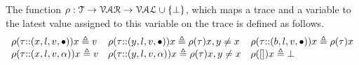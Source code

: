 The function $\rho : {\mathcal{T}} \to \mathcal{VAR} \to \mathcal{VAL} \cup \{\bot\}$, which maps a trace and a variable to the latest value assigned to this variable on the trace is defined as follows.
\[
\begin{array}{lll}
\rho(\mathtt{\tau} {\small ::} (x, l, v, \bullet)) x \triangleq v
&
\rho(\mathtt{\tau} {\small ::} (y, l, v, \bullet)) x \triangleq \rho(\mathtt{\tau}) x, y \neq x
&
\rho(\mathtt{\tau} {\small ::} (b, l, v, \bullet)) x \triangleq \rho(\mathtt{\tau}) x
\\
\rho(\mathtt{\tau} {\small ::} (x, l, v, \alpha)) x \triangleq v
&
\rho(\mathtt{\tau} {\small ::} (y, l, v, \alpha)) x \triangleq \rho(\mathtt{\tau}) x, y \neq x
&
\rho({[]} ) x \triangleq \bot
\end{array}
\]

